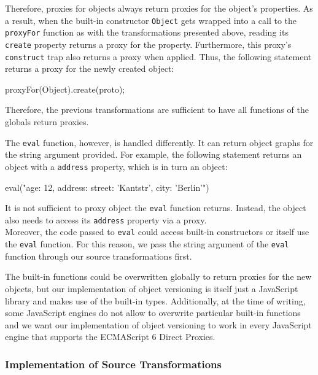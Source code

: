 Therefore, proxies for objects always return proxies for the object's properties.
As a result, when the built-in constructor \lstinline{Object} gets wrapped into a call to the \lstinline{proxyFor} function as with the transformations presented above, reading its \lstinline{create} property returns a proxy for the property.
Furthermore, this proxy's \lstinline{construct} trap also returns a proxy when applied.
Thus, the following statement returns a proxy for the newly created object:

\begin{code}{}{}
proxyFor(Object).create(proto);
\end{code}
\iffalse
\end{verbatim}\fi

Therefore, the previous transformations are sufficient to have all functions of the globals return proxies.

The \lstinline{eval} function, however, is handled differently.
It can return object graphs for the string argument provided.
For example, the following statement returns an object with a \lstinline{address} property, which is in turn an object:

\begin{code}{}{}
eval("{age: 12, address: {street: 'Kantstr', city: 'Berlin'}}")
\end{code}
\iffalse
\end{verbatim}\fi

It is not sufficient to proxy object the \lstinline{eval} function returns.
Instead, the object also needs to access its \lstinline{address} property via a proxy.\\
Moreover, the code passed to \lstinline{eval} could access built-in constructors or itself use the \lstinline{eval} function.
For this reason, we pass the string argument of the \lstinline{eval} function through our source transformations first.

The built-in functions could be overwritten globally to return proxies for the new objects, but our implementation of object versioning is itself just a JavaScript library and makes use of the built-in types.
Additionally, at the time of writing, some JavaScript engines do not allow to overwrite particular built-in functions and we want our implementation of object versioning to work in every JavaScript engine that supports the ECMAScript 6 Direct Proxies.

\subsubsection{Implementation of Source Transformations}


